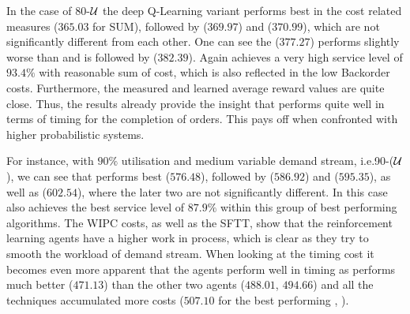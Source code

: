 \documentclass[envcountsame]{llncs}
\begin{document}
In the case of 80-\(\mathcal{U}\) the deep Q-Learning variant  performs best in the cost related
measures (\(365.03\) for SUM), followed by \BILThree{} (\(369.97\)) and  (\(370.99\)),
which are not significantly different from each other. One can see the \BILTwo{} (\(377.27\))
performs slightly worse than  and is followed by  (\(382.39\)). Again 
achieves a very high service level of \(93.4\%\) with reasonable sum of cost, which is also
reflected in the low Backorder costs. Furthermore, the measured and learned average reward values
are quite close. Thus, the results already provide the insight that \ARA{} performs quite well in
terms of timing for the completion of orders. This pays off when confronted with higher
probabilistic systems.

For instance, with \(90\%\) utilisation and medium variable demand stream, i.e.\@ 90-(\(\mathcal{U}\)), we
can see that  performs best (\(576.48\)), followed by  (\(586.92\)) and
\BILThree{} (\(595.35\)), as well as  (\(602.54\)), where the later two are not
significantly different. In this case  also achieves the best service level of \(87.9\%\)
within this group of best performing algorithms. The WIPC costs, as well as the SFTT, show that the
reinforcement learning agents have a higher work in process, which is clear as they try to smooth
the workload of demand stream. When looking at the timing cost it becomes even more apparent that
the agents perform well in timing as  performs much better (\(471.13\)) than the other two
agents (\(488.01\), \(494.66\)) and all the \BIL{} techniques accumulated more \fgibocName{} costs
(\(507.10\) for the best performing \BIL{}, \BILThree{}).
\end{document}
